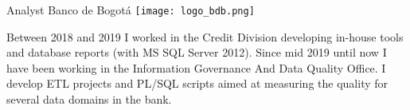 \documentclass[11pt,letter,sans]{moderncv}
\begin{document}
{Analyst} %
{Banco de Bogotá} %
{}
{} %
{\vspace{0.15cm}
  \texttt{[image: logo\_bdb.png]} %
  \vspace{0.15cm}}
 
\cvitem{}
{Between 2018 and 2019 I worked in the Credit Division developing in-house tools and database reports (with MS SQL Server 2012). Since mid 2019 until now I have been working in the Information Governance And Data Quality Office. I develop ETL projects and PL/SQL scripts aimed at measuring the quality for several data domains in the bank.} %
\cvitem{}
{} 
\end{document}
